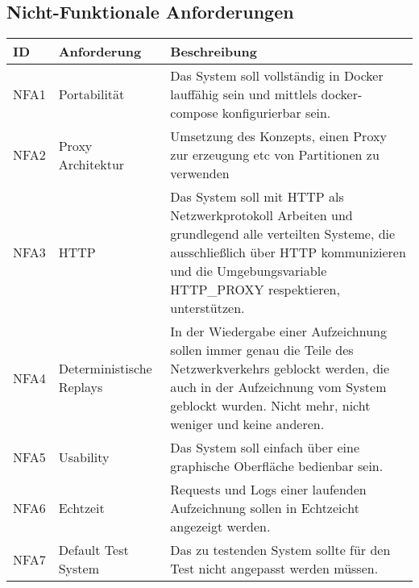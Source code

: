 \documentclass[a4paper]{report}
\begin{document}
\subsection{Nicht-Funktionale Anforderungen}
\begin{table}[]
	\begin{tabular}{|l|l|p{7cm}|}
		\hline
		ID   & Anforderung              & Beschreibung                                                                                                                                                                                                  \\ \hline
		NFA1 & Portabilität             & Das System soll vollständig in Docker lauffähig sein und mittlels docker-compose konfigurierbar sein.                                                                                                         \\ \hline
		NFA2 & Proxy Architektur        & Umsetzung des Konzepts, einen Proxy zur erzeugung etc von Partitionen zu verwenden                                                                                                                            \\ \hline
		NFA3 & HTTP                     & Das System soll mit HTTP als Netzwerkprotokoll Arbeiten und grundlegend alle verteilten Systeme, die ausschließlich über HTTP kommunizieren und die Umgebungsvariable HTTP\_PROXY respektieren, unterstützen. \\ \hline
		NFA4 & Deterministische Replays & In der Wiedergabe einer Aufzeichnung sollen immer genau die Teile des Netzwerkverkehrs geblockt werden, die auch in der Aufzeichnung vom System geblockt wurden. Nicht mehr, nicht weniger und keine anderen. \\ \hline
		NFA5 & Usability                & Das System soll einfach über eine graphische Oberfläche bedienbar sein.                                                                                                                                       \\ \hline
		NFA6 & Echtzeit                 & Requests und Logs einer laufenden Aufzeichnung sollen in Echtzeicht angezeigt werden.                                                                                                                         \\ \hline
		NFA7 & Default Test System      & Das zu testenden System sollte für den Test nicht angepasst werden müssen.                                                                                                                                    \\ \hline
	\end{tabular}
\end{table}
\end{document}
